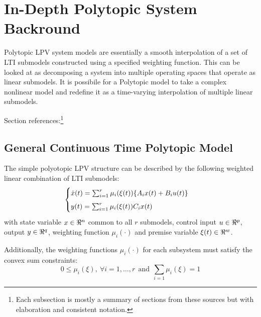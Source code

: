 \documentclass[]{article}
\begin{document}
%
%



\onecolumn
\newpage
\appendix
\section{In-Depth Polytopic System Backround} \label{apx:PolytopicSystemsBackround}
Polytopic LPV system models are essentially a smooth interpolation of a set of LTI submodels constructed using a specified weighting function. This can be looked at as decomposing a system into multiple operating spaces that operate as linear submodels. It is possibile for a Polytopic model to take a complex nonlinear model and redefine it as a time-varying interpolation of multiple linear submodels.

Section references:\footnote{Each subsection is mostly a summary of sections from these sources but with elaboration and consistent notation.}

\subsection{General Continuous Time Polytopic Model} 
The simple polyotopic LPV structure can be described by the following weighted linear combination of LTI submodels:
\begin{equation}\label{eq:CT_poly_sys_def}
	\begin{cases}
		\dot{x}(t) 	= \sum_{i=1}^r \mu_i(\xi(t))\{A_i x(t) + B_i u(t)\}  \vspace{5pt} \\ 
		y(t)		= \sum_{i=1}^r \mu_i(\xi(t)) C_i x(t)
	\end{cases}
\end{equation}
with state variable $x \in \real^n$ common to all $r$ submodels, control input $u \in \real^p$, output $y \in \real^q$, weighting function $\mu_i(\cdot)$ and premise variable $\xi(t) \in \real^{w}$. 

Additionally, the weighting functions $\mu_i (\cdot)$ for each subsystem must satisfy the convex sum constraints:
\begin{equation}\label{eq:convex_sum_constraints}
	0 \leq \mu_i(\xi), \ \forall i = 1,\dots,r \ \ \text{and} \ \ \sum_{i=1} \mu_i(\xi) = 1
\end{equation}

\end{document}
